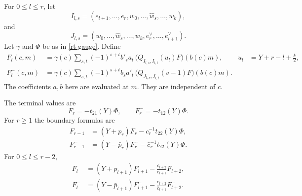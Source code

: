 For $0\leq l\leq r$, let
\[
 I_{l,s}=(e_{l+1},\ldots,e_r,
                             w_0,\ldots,\widehat w_s,\ldots,w_k),
\]
and
\[
 J_{l,s}=(w_0,\ldots,\widehat w_s,\ldots,w_k,
                             e_r^\vee,\ldots,e_{l+1}^\vee).
\]
Let $\gamma$ and $\Phi$ be as in \eqref{rt-gauge}.
Define
\begin{align}
 F_l(c,m)
  &=\gamma(c)\sum_{s,t}(-1)^{s+t}b'_s a_t\,
       \bigl(Q_{I_{l,s},I_{l,t}}(u_l)F\bigr)(b(c)m),
       &u_l&=Y+r-l+\frac k2,                       \label{rc-F}\\
 F_l^-(c,m)
  &=\gamma(c)\sum_{s,t}(-1)^{s+t}b_s a'_t\,
       \bigl(Q_{J_{l,s},J_{l,t}}(v-1)F\bigr)(b(c)m).
                                                     \label{rc-Fminus}
\end{align}
The coefficients $a,b$ here are evaluated at $m$.
They are independent of $c$.

\begin{proposition}\label{rc-recurrences}
The terminal values are
\[
                F_r=-t_{21}(Y)\Phi,\qquad
                F_r^-=-t_{12}(Y)\Phi.
\]
For $r\geq1$ the boundary formulas are
\begin{align}
 F_{r-1}&=(Y+p_r)F_r-c_r^{-1}t_{22}(Y)\Phi,
                                                     \label{rc-first-boundary}\\
 F_{r-1}^-&=(Y-\bar p_r)F_r^-
                              -\bar c_r^{-1}t_{22}(Y)\Phi .
                                                     \label{rc-last-boundary}
\end{align}
For $0\leq l\leq r-2$,
\begin{align}
 F_l&=(Y+p_{l+1})F_{l+1}
                       -\frac{c_{l+2}}{c_{l+1}}F_{l+2},
                                                     \label{rc-first-bulk}\\
 F_l^-&=(Y-\bar p_{l+1})F_{l+1}^-
                       -\frac{\bar c_{l+2}}{\bar c_{l+1}}F_{l+2}^- .
                                                     \label{rc-last-bulk}
\end{align}
\end{proposition}

